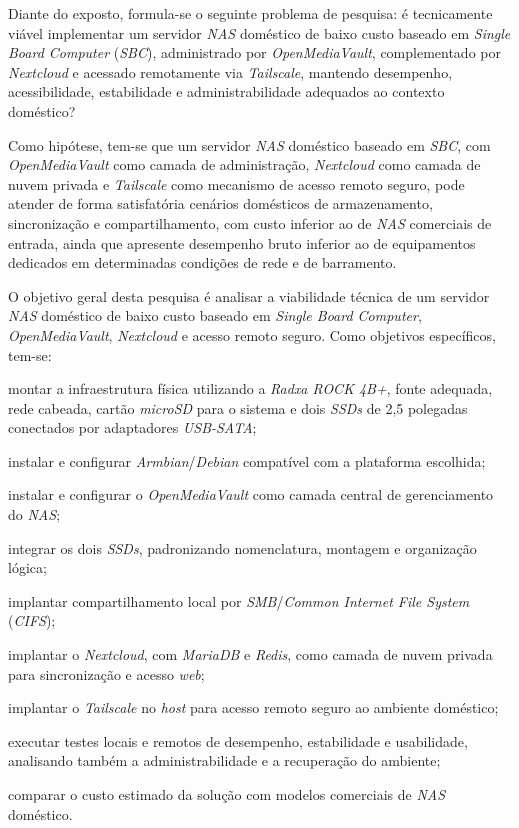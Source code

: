 \begin{figure}[H]
    \centering
    \fonteautoria
\end{figure}

Diante do exposto, formula-se o seguinte problema de pesquisa: é tecnicamente viável implementar um servidor \textit{NAS} doméstico de baixo custo baseado em \textit{Single Board Computer} (\textit{SBC}), administrado por \textit{OpenMediaVault}, complementado por \textit{Nextcloud} e acessado remotamente via \textit{Tailscale}, mantendo desempenho, acessibilidade, estabilidade e administrabilidade adequados ao contexto doméstico?

Como hipótese, tem-se que um servidor \textit{NAS} doméstico baseado em \textit{SBC}, com \textit{OpenMediaVault} como camada de administração, \textit{Nextcloud} como camada de nuvem privada e \textit{Tailscale} como mecanismo de acesso remoto seguro, pode atender de forma satisfatória cenários domésticos de armazenamento, sincronização e compartilhamento, com custo inferior ao de \textit{NAS} comerciais de entrada, ainda que apresente desempenho bruto inferior ao de equipamentos dedicados em determinadas condições de rede e de barramento.

O objetivo geral desta pesquisa é analisar a viabilidade técnica de um servidor \textit{NAS} doméstico de baixo custo baseado em \textit{Single Board Computer}, \textit{OpenMediaVault}, \textit{Nextcloud} e acesso remoto seguro. Como objetivos específicos, tem-se:
\begin{alineas}
    \item montar a infraestrutura física utilizando a \textit{Radxa ROCK 4B+}, fonte adequada, rede cabeada, cartão \textit{microSD} para o sistema e dois \textit{SSDs} de 2,5 polegadas conectados por adaptadores \textit{USB-SATA};
    \item instalar e configurar \textit{Armbian}/\textit{Debian} compatível com a plataforma escolhida;
    \item instalar e configurar o \textit{OpenMediaVault} como camada central de gerenciamento do \textit{NAS};
    \item integrar os dois \textit{SSDs}, padronizando nomenclatura, montagem e organização lógica;
    \item implantar compartilhamento local por \textit{SMB}/\textit{Common Internet File System} (\textit{CIFS});
    \item implantar o \textit{Nextcloud}, com \textit{MariaDB} e \textit{Redis}, como camada de nuvem privada para sincronização e acesso \textit{web};
    \item implantar o \textit{Tailscale} no \textit{host} para acesso remoto seguro ao ambiente doméstico;
    \item executar testes locais e remotos de desempenho, estabilidade e usabilidade, analisando também a administrabilidade e a recuperação do ambiente;
    \item comparar o custo estimado da solução com modelos comerciais de \textit{NAS} doméstico.
\end{alineas}

